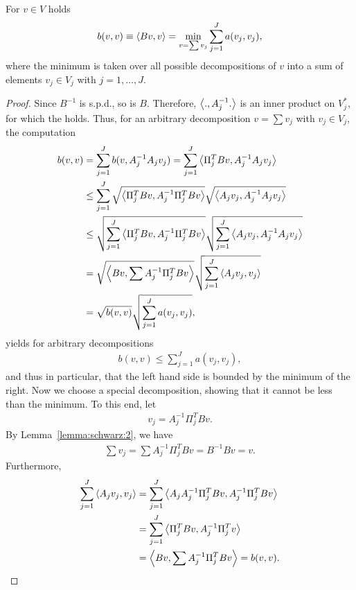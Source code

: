 \begin{lemma}
  \label{lemma:schwarz:5}
  For $v\in V$ holds
  \begin{gather}
    \label{eq:schwarz:5}
    b(v,v) \equiv \scal(B v,v) = \min_{v=\sum v_j} \sum_{j=1}^J a(v_j,v_j),
  \end{gather}
  where the minimum is taken over all possible decompositions of $v$
  into a sum of elements $v_j\in V_j$ with $j=1,\dots,J$.
\end{lemma}

\begin{proof}
  Since $B^{-1}$ is s.p.d., so is $B$. Therefore, $\scal(.,A_j^{-1}.)$
  is an inner product on $V_j^*$, for which the  holds. Thus, for an arbitrary decomposition $v=\sum v_j$
  with $v_j\in V_j$, the computation
  \begin{align*}
    b(v,v)
    &= \sum_{j=1}^J b(v, A_j^{-1} A_j v_j)
    = \sum_{j=1}^J \scal(\Pi^T_j B v, A_j^{-1} A_j v_j) \\
    &\le \sum_{j=1}^J \sqrt{\scal(\Pi^T_j B v, A_j^{-1}\Pi^T_j B v)}
    \sqrt{\scal(A_j v_j, A_j^{-1}A_j v_j)} \\
    & \le \sqrt{\sum_{j=1}^J \scal(\Pi^T_j B v, A_j^{-1}\Pi^T_j
      B v) }
    \sqrt{\sum_{j=1}^J \scal(A_j v_j,A_j^{-1}A_j v_j)} \\
    &= \sqrt{\scal(B v, {\sum A_j^{-1}\Pi^T_j} B v)}
    \sqrt{\sum_{j=1}^J \scal(A_j v_j, v_j)} \\
    &= \sqrt{b(v,v)} \sqrt{\sum_{j=1}^J a(v_j, v_j)},
  \end{align*}
  yields for arbitrary decompositions
  \begin{gather}
    \label{eq:schwarz:17}
    b(v,v) \le \sum_{j=1}^J a(v_j, v_j),
  \end{gather}
  and thus in particular, that the left hand side is bounded by the
  minimum of the right. Now we choose a special decomposition, showing
  that it cannot be less than the minimum. To this end, let
  \begin{gather}
    \label{eq:schwarz:18}
    v_j = A_j^{-1} \Pi^T_j B v.
  \end{gather}
  By Lemma~\ref{lemma:schwarz:2}, we have
  \begin{gather*}
    \sum v_j = \sum A_j^{-1} \Pi^T_j B v = B^{-1} B v = v.
  \end{gather*}
  Furthermore,
  \begin{align*}
    \sum_{j=1}^J \scal(A_j v_j, v_j)
    &= \sum_{j=1}^J \scal(A_j A_j^{-1} \Pi^T_j B v, A_j^{-1} \Pi^T_j
    B v) \\
    &= \sum_{j=1}^J \scal(\Pi^T_j B v, A_j^{-1} \Pi^T_j v) \\
    &= \scal(B v, \sum A_j^{-1} \Pi^T_j B v) = b(v, v).
  \end{align*}
\end{proof}

